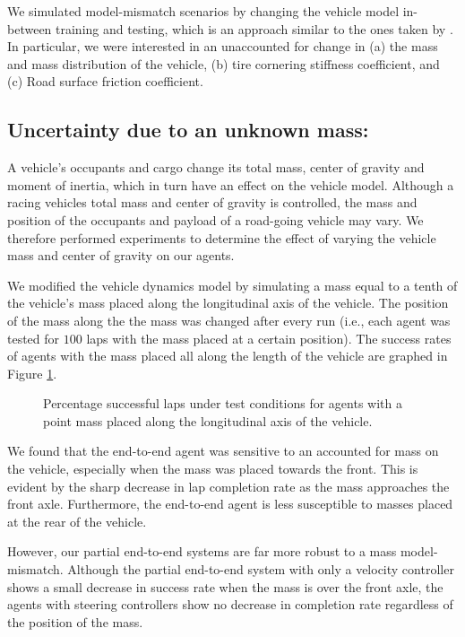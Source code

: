 We simulated model-mismatch scenarios by changing the vehicle model in-between training and testing, which is an approach similar to the ones taken by \cite{Fuchs2021, Ghignone2022}.
In particular, we were interested in an unaccounted for change in 
(a) the mass and mass distribution of the vehicle,
(b) tire cornering stiffness coefficient, and 
(c) Road surface friction coefficient.


\subsection{Uncertainty due to an unknown mass:}

A vehicle's occupants and cargo change its total mass, center of gravity and moment of inertia, which in turn have an effect on the vehicle model.
Although a racing vehicles total mass and center of gravity is controlled, the mass and position of the occupants and payload of a road-going vehicle may vary.
We therefore performed experiments to determine the effect of varying the vehicle mass and center of gravity on our agents.

We modified the vehicle dynamics model by simulating a mass equal to a tenth of the vehicle's mass placed along the longitudinal axis of the vehicle.
The position of the mass along the the mass was changed after every run (i.e., each agent was tested for $100$ laps with the mass placed at a certain position).
The success rates of agents with the mass placed all along the length of the vehicle are graphed in Figure \ref{fig:unknown_mass}.

\begin{figure}[htb!]
    \centering
    
    \caption[Percentage successful laps under test conditions for agents with a point mass placed along the longitudinal axis of the vehicle]{Percentage successful laps under test conditions for agents with a point mass placed along the longitudinal axis of the vehicle.}
    \label{fig:unknown_mass}
\end{figure}

We found that the end-to-end agent was sensitive to an accounted for mass on the vehicle, especially when the mass was placed towards the front.
This is evident by the sharp decrease in lap completion rate as the mass approaches the front axle.
Furthermore, the end-to-end agent is less susceptible to masses placed at the rear of the vehicle.

However, our partial end-to-end systems are far more robust to a mass model-mismatch.
Although the partial end-to-end system with only a velocity controller shows a small decrease in success rate when the mass is over the front axle, the agents with steering controllers show no decrease in completion rate regardless of the position of the mass.

